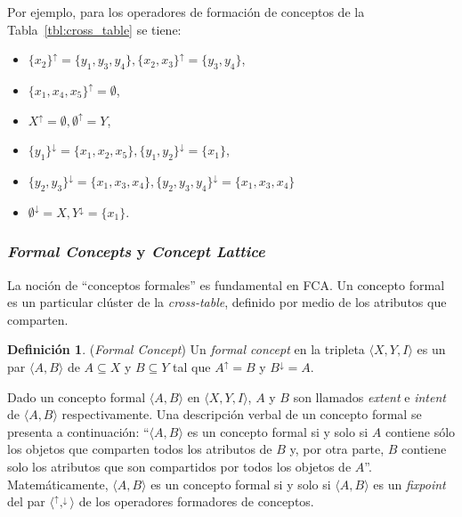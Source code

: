 \documentclass[12pt,oneside,letterpaper]{book}
\newcommand{\eng}[1]{\textit{#1}\xspace}			%
\newcommand{\abr}[1]{\textsc{#1}\xspace}           %
\theoremstyle{definition}
\newtheorem{definition}{Definición}[section]
\begin{document}
Por ejemplo, para los operadores de formación de conceptos de la Tabla~\ref{tbl:cross_table} se tiene:
\begin{itemize}
 	\item $\{x_2\}^{\uparrow} = \{y_1, y_3, y_4\}, \{x_2,x_3\}^{\uparrow} = \{y_3, y_4\}$,
 	\item $\{x_1, x_4, x_5\}^{\uparrow} = \emptyset$,
 	\item $X^{\uparrow} = \emptyset, \emptyset^{\uparrow} = Y$,
 	\item $\{y_1\}^{\downarrow} = \{x_1,x_2,x_5\}, \{y_1,y_2\}^{\downarrow} = \{x_1\}$,
 	\item $\{y_2,y_3\}^{\downarrow} = \{x_1,x_3,x_4\}, \{y_2,y_3,y_4\}^{\downarrow} = \{x_1,x_3,x_4\}$
 	\item $\emptyset^\downarrow = X, Y^\downarrow = \{x_1\}$.
 \end{itemize}

 \subsubsection{\eng{Formal Concepts} y \eng{Concept Lattice}}
 \label{ssub:formal_concept_concept_lattice}
 La noción de ``conceptos formales'' es fundamental en \abr{FCA}. Un concepto formal es un particular clúster de la \eng{cross-table}, definido por medio de los atributos que comparten.

 \begin{definition}{(\eng{Formal Concept})}
 Un \eng{formal concept} en la tripleta $\langle X,Y,I \rangle$ es un par $\langle A,B \rangle$ de $A \subseteq X$ y $B \subseteq Y$ tal que $A^\uparrow = B$ y $B^\downarrow = A$.
 \end{definition}

 Dado un concepto formal $\langle A,B \rangle$ en $\langle X,Y,I \rangle$, $A$ y $B$ son llamados \eng{extent} e \eng{intent} de $\langle A,B \rangle$ respectivamente. Una descripción verbal de un concepto formal se presenta a continuación: ``$\langle A,B \rangle$ es un concepto formal si y solo si $A$ contiene sólo los objetos que comparten todos los atributos de $B$ y, por otra parte, $B$ contiene solo los atributos que son compartidos por todos los objetos de $A$''. Matemáticamente, $\langle A,B \rangle$ es un concepto formal si y solo si $\langle A,B \rangle$ es un \eng{fixpoint} del par $\langle ^\uparrow, ^\downarrow\rangle$ de los operadores formadores de conceptos.
\end{document}
